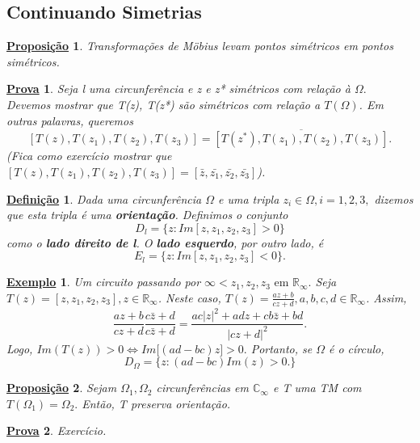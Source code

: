 \documentclass{article}
\newtheorem*{def*}{\underline{Defini\c c\~ao}}
\newtheorem{example}{\underline{Exemplo}}[section]
\newtheorem*{proof*}{\underline{Prova}}
\newtheorem*{prop*}{\underline{Proposi\c c\~ao}}
\begin{document}
  \subsection{Continuando Simetrias}
  \begin{prop*}
    Transforma\c c\~oes de M\"{o}bius levam pontos sim\'etricos em pontos sim\'etricos.
  \end{prop*}
  \begin{proof*}
    Seja l uma circunfer\^encia e z e z* sim\'etricos com rela\c c\~ao \`a $\Omega.$  Devemos mostrar que T(z), T(z*) s\~ao sim\'etricos
    com rela\c c\~ao a $T(\Omega)$. Em outras palavras, queremos 
    $$
    [T(z), T(z_{1}), T(z_2), T(z_3)] = \overline{[T(z^*), T(z_1), T(z_2), T(z_3)]}.
    $$
    (Fica como exerc\'icio mostrar que $[T(z), T(z_{1}), T(z_2), T(z_3)] = [\bar{z}, \bar{z_1}, \bar{z_2}, \bar{z_3}]$).
  \end{proof*}
  \begin{def*}
    Dada uma circunfer\^encia $\Omega$ e uma tripla $z_{i}\in \Omega, i = 1, 2, 3,$ dizemos que esta tripla \'e uma \textbf{orienta\c c\~ao}.
    Definimos o conjunto
    $$
    D_{l} = \{z: Im[z, z_1, z_2, z_3] > 0\}
    $$
    como o \textbf{lado direito de l}. O \textbf{lado esquerdo}, por outro lado, \'e 
    $$
    E_{l} = \{z: Im[z, z_1, z_2, z_3] < 0\}.
    $$
  \end{def*}
  \begin{example}
    Um circuito passando por $\infty < z_1, z_2, z_3\text{ em }\mathbb{R}_\infty.$ Seja $T(z) = [z, z_1, z_2, z_3], z\in \mathbb{R}_\infty$. 
    Neste caso, $T(z) = \frac{az + b}{cz + d}, a, b, c, d\in \mathbb{R}_\infty$. Assim, 
    $$
    \frac{az + b}{cz + d}\frac{c\bar{z} + d}{c\bar{z} + d} = \frac{ac|z|^2 + adz + cb\bar{z} + bd}{|cz+d|^2}.
    $$
    Logo, $Im(T(z)) > 0\Longleftrightarrow Im\biggl[(ad-bc)z\biggr] > 0.$ Portanto, se $\Omega$ \'e o c\'irculo,
    $$ 
    D_{\Omega} = \{z: (ad - bc)Im(z) > 0.\}
    $$
  \end{example}
  \begin{prop*}
    Sejam $\Omega_1, \Omega_2$ circunfer\^encias em $\mathbb{C}_\infty$ e T uma TM com $T(\Omega_1) = \Omega_2.$ Ent\~ao, T preserva
    orienta\c c\~ao.
  \end{prop*}
  \begin{proof*}
    Exerc\'icio.
  \end{proof*}
\end{document}

